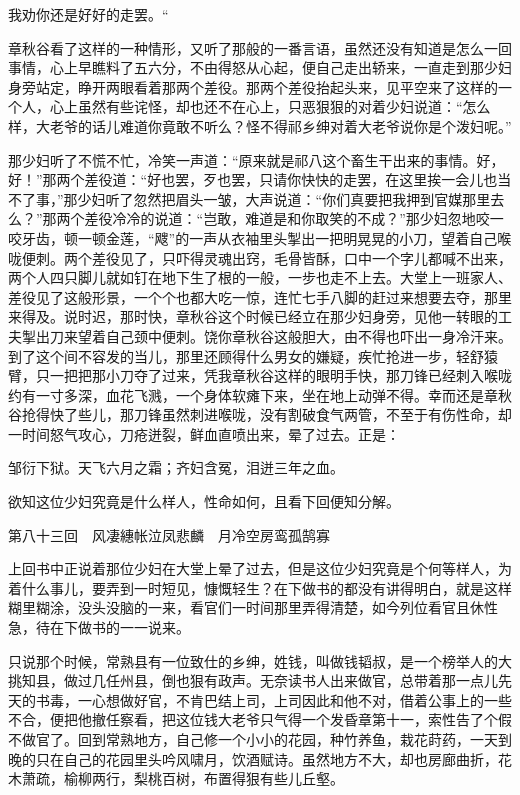 \documentclass[12pt,UTF8]{ctexbook}
\begin{document}
{{{我劝你还是好好的走罢。“

章秋谷看了这样的一种情形，又听了那般的一番言语，虽然还没有知道是怎么一回事情，心上早瞧料了五六分，不由得怒从心起，便自己走出轿来，一直走到那少妇身旁站定，睁开两眼看着那两个差役。那两个差役抬起头来，见平空来了这样的一个人，心上虽然有些诧怪，却也还不在心上，只恶狠狠的对着少妇说道：“怎么样，大老爷的话儿难道你竟敢不听么？怪不得祁乡绅对着大老爷说你是个泼妇呢。”

那少妇听了不慌不忙，冷笑一声道：“原来就是祁八这个畜生干出来的事情。好，好！”那两个差役道：“好也罢，歹也罢，只请你快快的走罢，在这里挨一会儿也当不了事，”那少妇听了忽然把眉头一皱，大声说道：“你们真要把我押到官媒那里去么？”那两个差役冷冷的说道：“岂敢，难道是和你取笑的不成？”那少妇忽地咬一咬牙齿，顿一顿金莲，“飕”的一声从衣袖里头掣出一把明晃晃的小刀，望着自己喉咙便刺。两个差役见了，只吓得灵魂出窍，毛骨皆酥，口中一个字儿都喊不出来，两个人四只脚儿就如钉在地下生了根的一般，一步也走不上去。大堂上一班家人、差役见了这般形景，一个个也都大吃一惊，连忙七手八脚的赶过来想要去夺，那里来得及。说时迟，那时快，章秋谷这个时候已经立在那少妇身旁，见他一转眼的工夫掣出刀来望着自己颈中便刺。饶你章秋谷这般胆大，由不得也吓出一身冷汗来。到了这个间不容发的当儿，那里还顾得什么男女的嫌疑，疾忙抢进一步，轻舒猿臂，只一把把那小刀夺了过来，凭我章秋谷这样的眼明手快，那刀锋已经刺入喉咙约有一寸多深，血花飞溅，一个身体软瘫下来，坐在地上动弹不得。幸而还是章秋谷抢得快了些儿，那刀锋虽然刺进喉咙，没有割破食气两管，不至于有伤性命，却一时间怒气攻心，刀疮迸裂，鲜血直喷出来，晕了过去。正是：

邹衍下狱。天飞六月之霜；齐妇含冤，泪迸三年之血。

欲知这位少妇究竟是什么样人，性命如何，且看下回便知分解。





第八十三回　风凄繐帐泣凤悲麟　月冷空房鸾孤鹄寡





上回书中正说着那位少妇在大堂上晕了过去，但是这位少妇究竟是个何等样人，为着什么事儿，要弄到一时短见，慷慨轻生？在下做书的都没有讲得明白，就是这样糊里糊涂，没头没脑的一来，看官们一时间那里弄得清楚，如今列位看官且休性急，待在下做书的一一说来。

只说那个时候，常熟县有一位致仕的乡绅，姓钱，叫做钱韬叔，是一个榜举人的大挑知县，做过几任州县，倒也狠有政声。无奈读书人出来做官，总带着那一点儿先天的书毒，一心想做好官，不肯巴结上司，上司因此和他不对，借着公事上的一些不合，便把他撤任察看，把这位钱大老爷只气得一个发昏章第十一，索性告了个假不做官了。回到常熟地方，自己修一个小小的花园，种竹养鱼，栽花莳药，一天到晚的只在自己的花园里头吟风啸月，饮酒赋诗。虽然地方不大，却也房廊曲折，花木萧疏，榆柳两行，梨桃百树，布置得狠有些儿丘壑。

}}}
\end{document}
